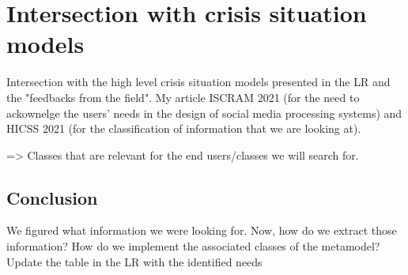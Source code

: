 \section{Intersection with crisis situation models}
Intersection with the high level crisis situation models presented in the LR and the "feedbacks from the field".
My article ISCRAM 2021 (for the need to ackownelge the users' needs in the design of social media processing systems) and HICSS 2021 (for the classification of information that we are looking at).

=> Classes that are relevant for the end users/classes we will search for.

\subsection{Conclusion}
We figured what information we were looking for. Now, how do we extract those information? How do we implement the associated classes of the metamodel?
Update the table in the LR with the identified needs


